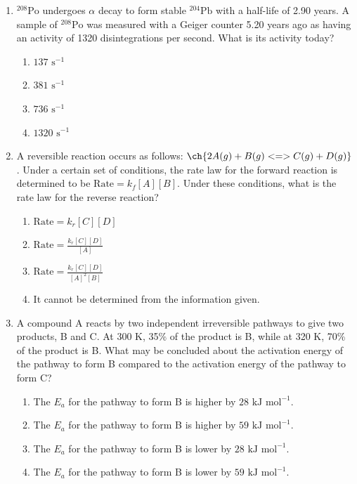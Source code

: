 \documentclass[twocolumn, 10pt]{article}
\begin{document}
\begin{enumerate}
    \item $^{208}\text{Po}$ undergoes $\alpha$ decay to form stable $^{204}\text{Pb}$ with a half-life of 2.90 years. A sample of $^{208}\text{Po}$ was measured with a Geiger counter 5.20 years ago as having an activity of 1320 disintegrations per second. What is its activity today?
    \begin{enumerate}
        \item $137 \text{ s}^{-1}$
        \item $381 \text{ s}^{-1}$
        \item $736 \text{ s}^{-1}$
        \item $1320 \text{ s}^{-1}$
    \end{enumerate}

    \item A reversible reaction occurs as follows: $\ch{2A(g) + B(g) <=> C(g) + D(g)}$. Under a certain set of conditions, the rate law for the forward reaction is determined to be $\text{Rate} = k_f[A][B]$. Under these conditions, what is the rate law for the reverse reaction?
    \begin{enumerate}
        \item $\text{Rate} = k_r[C][D]$
        \item $\text{Rate} = \frac{k_r[C][D]}{[A]}$
        \item $\text{Rate} = \frac{k_r[C][D]}{[A]^2[B]}$
        \item It cannot be determined from the information given.
    \end{enumerate}

    \item A compound A reacts by two independent irreversible pathways to give two products, B and C. At 300 K, 35\% of the product is B, while at 320 K, 70\% of the product is B. What may be concluded about the activation energy of the pathway to form B compared to the activation energy of the pathway to form C?
    \begin{enumerate}
        \item The $E_a$ for the pathway to form B is higher by $28\text{ kJ mol}^{-1}$.
        \item The $E_a$ for the pathway to form B is higher by $59\text{ kJ mol}^{-1}$.
        \item The $E_a$ for the pathway to form B is lower by $28\text{ kJ mol}^{-1}$.
        \item The $E_a$ for the pathway to form B is lower by $59\text{ kJ mol}^{-1}$.
    \end{enumerate}


\end{enumerate}
\end{document}
